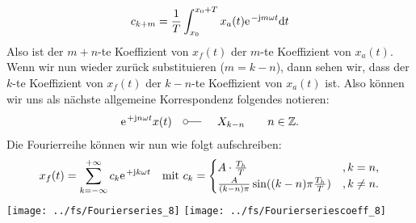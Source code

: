 \documentclass[11pt,a4paper,DIV=12]{scrartcl}
\newcommand{\diff}{\mathrm{d}}
\begin{document}
\begin{align}
	c_{k+m}=\frac{1}{T}\int_{x_0}^{x_0+T}x_{a}(t)\e^{-\im m \omega t}\diff t
\end{align}
Also ist der $m+n$-te Koeffizient von $x_{f}(t)$ der $m$-te Koeffizient von $x_{a}(t)$. Wenn wir nun wieder zurück substituieren ($m=k-n$), dann sehen wir, dass der $k$-te Koeffizient von $x_{f}(t)$ der $k-n$-te Koeffizient von $x_{a}(t)$ ist.
Also können wir uns als nächste allgemeine Korrespondenz folgendes notieren:
\begin{align}
	\label{eq:CorrespondenceModulation}
	\e^{+\im n \omega t}x(t)\quad\fourier\quad X_{k-n}\quad\quad n\in\mathbb{Z}.
\end{align}
Die Fourierreihe können wir nun wie folgt aufschreiben:
\begin{align}
	x_{f}(t)=\sum_{k=-\infty}^{+\infty}c_k\e^{+\im k \omega t}\quad\text{mit }c_k=\begin{cases}
		A\cdot\frac{T_h}{T} &,k=n,\\
		\frac{A}{(k-n)\pi}\sin((k-n)\pi\frac{T_h}{T}) &,k\neq n.
	\end{cases}
\end{align}
\newpage
\texttt{[image: ../fs/Fourierseries\_8]}
\texttt{[image: ../fs/Fourierseriescoeff\_8]}
\newpage
\end{document}
